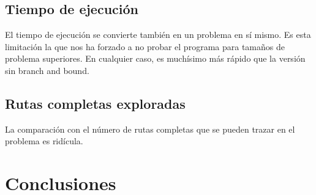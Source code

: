 \documentclass[a4paper, 11pt]{article}
\begin{document}
\subsection{Tiempo de ejecución}
El tiempo de ejecución se convierte también en un problema en sí mismo. Es esta limitación la que nos ha forzado a no probar el programa para tamaños de problema superiores. En cualquier caso, es muchísimo más rápido que la versión sin branch and bound.

\subsection{Rutas completas exploradas}
La comparación con el número de rutas completas que se pueden trazar en el problema es ridícula.

\section{Conclusiones}
\end{document}

